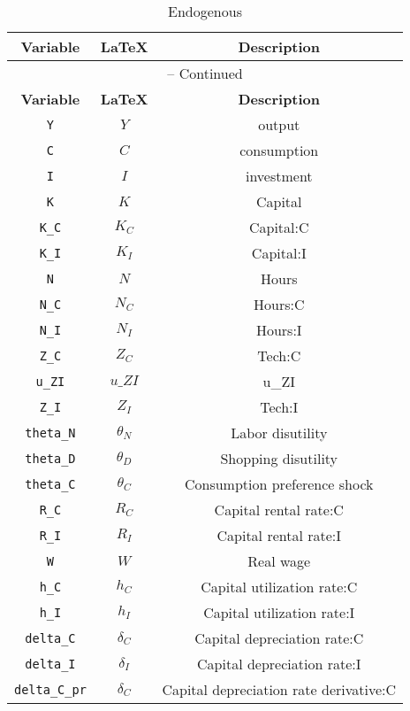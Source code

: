 \begin{center}
\begin{longtable}{ccc}
\caption{Endogenous}\\%
\hline%
\multicolumn{1}{c}{\textbf{Variable}} &
\multicolumn{1}{c}{\textbf{\LaTeX}} &
\multicolumn{1}{c}{\textbf{Description}}\\%
\hline\hline%
\endfirsthead
\multicolumn{3}{c}{{\tablename} \thetable{} -- Continued}\\%
\hline%
\multicolumn{1}{c}{\textbf{Variable}} &
\multicolumn{1}{c}{\textbf{\LaTeX}} &
\multicolumn{1}{c}{\textbf{Description}}\\%
\hline\hline%
\endhead
\texttt{Y} & ${Y}$ & output\\
\texttt{C} & ${C}$ & consumption\\
\texttt{I} & ${I}$ & investment\\
\texttt{K} & ${K}$ & Capital\\
\texttt{K\_C} & ${K_C}$ & Capital:C\\
\texttt{K\_I} & ${K_I}$ & Capital:I\\
\texttt{N} & ${N}$ & Hours\\
\texttt{N\_C} & ${N_C}$ & Hours:C\\
\texttt{N\_I} & ${N_I}$ & Hours:I\\
\texttt{Z\_C} & ${Z_C}$ & Tech:C\\
\texttt{u\_ZI} & $u\_ZI$ & u\_ZI\\
\texttt{Z\_I} & ${Z_I}$ & Tech:I\\
\texttt{theta\_N} & ${\theta_N}$ & Labor disutility\\
\texttt{theta\_D} & ${\theta_D}$ & Shopping disutility\\
\texttt{theta\_C} & ${\theta_C}$ & Consumption preference shock\\
\texttt{R\_C} & ${R_C}$ & Capital rental rate:C\\
\texttt{R\_I} & ${R_I}$ & Capital rental rate:I\\
\texttt{W} & ${W}$ & Real wage\\
\texttt{h\_C} & ${h_C}$ & Capital utilization rate:C\\
\texttt{h\_I} & ${h_I}$ & Capital utilization rate:I\\
\texttt{delta\_C} & ${\delta_C}$ & Capital depreciation rate:C\\
\texttt{delta\_I} & ${\delta_I}$ & Capital depreciation rate:I\\
\texttt{delta\_C\_pr} & ${\delta_C}$ & Capital depreciation rate derivative:C\\

\end{longtable}
\end{center}
